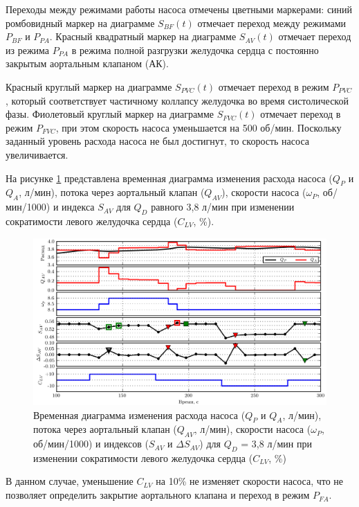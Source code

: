 Переходы между режимами работы насоса отмечены цветными маркерами: синий ромбовидный маркер на диаграмме $S_{BF}(t)$ отмечает переход между режимами $P_{BF}$ и $P_{PA}$.  Красный квадратный маркер на диаграмме $S_{AV}(t)$ отмечает переход из режима $P_{PA}$ в режима полной разгрузки желудочка сердца с постоянно закрытым аортальным клапаном (АК). 

Красный круглый маркер на диаграмме $S_{PVC}(t)$ отмечает переход в режим $P_{PVC}$, который соответствует частичному коллапсу желудочка во время систолической фазы. Фиолетовый круглый маркер на диаграмме $S_{FVC}(t)$ отмечает переход в режим $P_{FVC}$, при этом скорость насоса уменьшается на 500 об/мин. Поскольку заданный уровень расхода насоса не был достигнут, то скорость насоса увеличивается.

На рисунке \ref{img:waveform_cv_variation} представлена временная диаграмма изменения расхода насоса ($Q_P$ и $Q_A$, л/мин), потока через аортальный клапан ($Q_{AV}$), скорости насоса ($\omega_P$, об/мин/1000) и индекса $S_{AV}$ для $Q_D$ равного 3,8 л/мин при изменении сократимости левого желудочка сердца ($C_{LV}$, \%).

\begin{figure}[ht] 
  \center
  \includegraphics [scale=1.0] {../images/c3_waveform_cv_variation}
  \caption{Временная диаграмма изменения расхода насоса ($Q_P$ и $Q_A$, л/мин), потока через аортальный клапан ($Q_{AV}$, л/мин), скорости насоса ($\omega_P$, об/мин/1000) и индексов ($S_{AV}$ и $\Delta S_{AV}$) для $Q_D$ = 3,8 л/мин при изменении сократимости левого желудочка сердца ($C_{LV}$, \%)} 
  \label{img:waveform_cv_variation}  
\end{figure}

В данном случае, уменьшение $C_{LV}$ на 10\% не изменяет скорости насоса, что не позволяет определить закрытие аортального клапана и переход в режим $P_{FA}$. 

